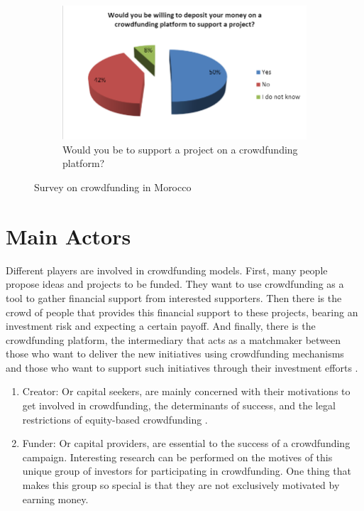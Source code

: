 \begin{center}
\begin{figure}
      \begin{subfigure}{.4\textwidth}
            \centering
            \includegraphics[width=\textwidth]{assets/willing.png}
            \caption{Would you be to support a project on a crowdfunding platform?}
            \label{fig:willing}
      \end{subfigure}
      \caption{Survey on crowdfunding in Morocco}
            \label{fig:survey}
\end{figure}

\end{center}



\section*{ Main Actors }
Different players are involved in crowdfunding models. First, many people propose ideas and
projects to be funded. They want to use crowdfunding as a tool to gather financial support from interested supporters.
Then there is the crowd of people that provides this financial support to these projects, bearing an investment
risk and expecting a certain payoff. And finally, there is the crowdfunding platform, the intermediary that acts
as a matchmaker between those who want to deliver the new initiatives using crowdfunding mechanisms
and those who want to support such initiatives through their investment efforts \cite{10.1108/09564231111155079}.

\begin{enumerate}
      \item Creator:
            Or capital seekers, are mainly concerned with their motivations to get involved in crowdfunding, the determinants of success, and the legal restrictions of equity-based crowdfunding \cite{10.1007/978-3-319-18017-5_3}.

      \item Funder:
      Or capital providers, are essential to the success of a crowdfunding campaign. Interesting research can be performed on the motives of this unique group of investors for participating in crowdfunding. One thing that
            makes this group so special is that they are not exclusively motivated by earning money.

\end{enumerate}